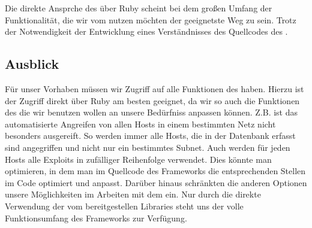 Die direkte Ansprche des  über Ruby scheint bei dem großen Umfang
der Funktionalität, die wir vom  nutzen möchten der
geeignetste Weg zu sein. Trotz der Notwendigkeit der Entwicklung eines
Verständnisses des Quellcodes des .

\subsection{Ausblick}

Für unser Vorhaben müssen wir Zugriff auf alle Funktionen des
 haben. Hierzu ist der Zugriff direkt über Ruby am besten
geeignet, da wir so auch die Funktionen des  die wir benutzen
wollen an unsere Bedürfniss anpassen können. 
Z.B. ist das automatisierte Angreifen von allen Hosts in einem
bestimmten Netz nicht besonders ausgereift. So werden immer alle
Hosts, die in der Datenbank erfasst sind angegriffen und nicht nur ein
bestimmtes Subnet. Auch werden für jeden Hosts alle Exploits in
zufälliger Reihenfolge verwendet. Dies könnte man optimieren, in dem
man im Quellcode des Frameworks die entsprechenden Stellen im Code
optimiert und anpasst. Darüber hinaus schränkten die anderen Optionen
unsere Möglichkeiten im Arbeiten mit dem  ein. Nur durch die
direkte Verwendung der vom  bereitgestellen Libraries steht
uns der volle Funktionsumfang des Frameworks zur Verfügung.
